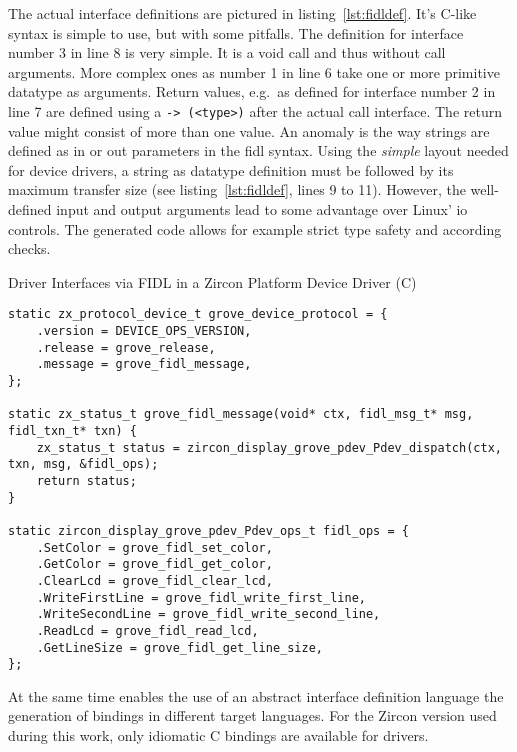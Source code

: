 The actual interface definitions are pictured in listing~\ref{lst:fidldef}.
It's C-like syntax is simple to use, but with some pitfalls.
The definition for interface number 3 in line 8 is very simple.
It is a void call and thus without call arguments.
More complex ones as number 1 in line 6 take one or more primitive datatype as arguments.
Return values, e.g.\ as defined for interface number 2 in line 7 are defined using a \texttt{-> (<type>)} after the actual call interface.
The return value might consist of more than one value.
An anomaly is the way strings are defined as in or out parameters in the \ac{fidl} syntax.
Using the \textit{simple} layout needed for device drivers, a string as datatype definition must be followed by its maximum transfer size (see listing~\ref{lst:fidldef}, lines 9 to 11).
However, the well-defined input and output arguments lead to some advantage over Linux' \ac{io} controls.
The generated code allows for example strict type safety and according checks.
%
\begin{listing} [H]
    \caption{Driver Interfaces via FIDL in a Zircon Platform Device Driver (C)}
\label{lst:fidlinit}
\begin{verbatim}
static zx_protocol_device_t grove_device_protocol = {
    .version = DEVICE_OPS_VERSION,
    .release = grove_release,
    .message = grove_fidl_message,
};

static zx_status_t grove_fidl_message(void* ctx, fidl_msg_t* msg, fidl_txn_t* txn) {
    zx_status_t status = zircon_display_grove_pdev_Pdev_dispatch(ctx, txn, msg, &fidl_ops);
    return status;
}

static zircon_display_grove_pdev_Pdev_ops_t fidl_ops = {
    .SetColor = grove_fidl_set_color,
    .GetColor = grove_fidl_get_color,
    .ClearLcd = grove_fidl_clear_lcd,
    .WriteFirstLine = grove_fidl_write_first_line,
    .WriteSecondLine = grove_fidl_write_second_line,
    .ReadLcd = grove_fidl_read_lcd,
    .GetLineSize = grove_fidl_get_line_size,
};
\end{verbatim}
\end{listing}
%
At the same time enables the use of an abstract interface definition language the generation of bindings in different target languages.
For the Zircon version used during this work, only idiomatic C bindings are available for drivers.

